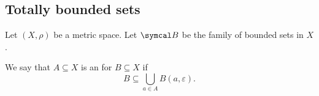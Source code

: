 \subsection{Totally bounded sets}\label{subsec:totally_bounded_sets}

Let \( (X, \rho) \) be a metric space. Let \( \Cal{B} \) be the family of bounded sets in \( X \).

\begin{definition}\label{def:epsilon_net}
  We say that \( A \subseteq X \) is an  for \( B \subseteq X \) if
  \begin{equation}
    B \subseteq \bigcup_{a \in A} B(a, \varepsilon).
  \end{equation}
\end{definition}


